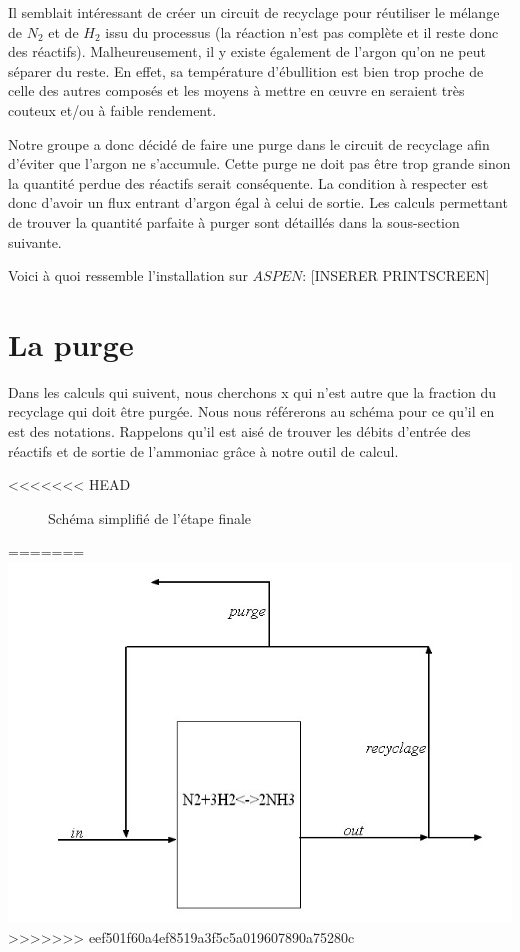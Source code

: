 \documentclass[a4paper, oneside, 12pt]{article}
\begin{document}
Il semblait intéressant de créer un circuit de recyclage pour réutiliser 
le mélange de $N_2$ et de $H_2$ issu du processus (la réaction n'est pas complète 
et il reste donc des réactifs). 
Malheureusement, il y existe également de l'argon qu'on ne peut séparer du reste. 
En effet, sa température d'ébullition est bien trop proche de celle des autres composés et 
les moyens à mettre en œuvre en seraient très couteux et/ou à faible rendement. 

Notre groupe a donc décidé de faire une purge dans le circuit de recyclage 
afin d'éviter que l'argon ne s'accumule. Cette purge ne doit pas être trop grande 
sinon la quantité perdue des réactifs serait conséquente. 
La condition à respecter est donc d'avoir un flux entrant d'argon égal à celui de sortie. 
Les calculs permettant de trouver la quantité parfaite à purger 
sont détaillés dans la sous-section suivante.

Voici à quoi ressemble l'installation sur $ASPEN$:
[INSERER PRINTSCREEN]

\section{La purge}

Dans les calculs qui suivent, nous cherchons x qui n'est autre que la fraction du recyclage 
qui doit être purgée. Nous nous référerons au schéma pour ce qu'il en est des notations. 
Rappelons qu'il est aisé de trouver les débits d'entrée des réactifs 
et de sortie de l'ammoniac grâce à notre outil de calcul.

<<<<<<< HEAD
\begin{figure}[h!]
	\begin{center}
		
	\end{center}
	\caption{Schéma simplifié de l'étape finale}
	\label{fig:schema}
\end{figure}
=======
\includegraphics[scale=0.5]{etape_finale_simpl.jpg} 
>>>>>>> eef501f60a4ef8519a3f5c5a019607890a75280c
\end{document}
